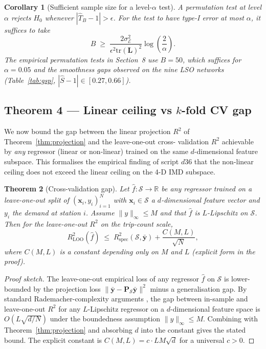 \documentclass[11pt,a4paper]{article}
\newcommand{\tr}{\mathrm{tr}}
\newcommand{\1}{\mathbb{1}}
\newcommand{\bP}{\mathbf{P}}
\newcommand{\by}{\bar{\mathbf{y}}}
\newcommand{\Lcomb}{\mathbf{L}}
\theoremstyle{plain}
\newtheorem{theorem}{Theorem}
\newtheorem{corollary}[theorem]{Corollary}
\theoremstyle{definition}
\theoremstyle{remark}
\begin{document}
\begin{corollary}[Sufficient sample size for a level-$\alpha$ test]
\label{cor:perm-sample-size}
A permutation test at level $\alpha$ rejects $H_0$ whenever
$|\hat T_B - 1| > \epsilon$.  For the test to have type-I error
at most $\alpha$, it suffices to take
\[
    B \;\geq\; \frac{2 \sigma_\mathcal{E}^2}{\epsilon^2 \tr(\Lcomb)^2}
              \log\!\left( \frac{2}{\alpha} \right).
\]
The empirical permutation tests in \emph{Section~8} use
$B = 50$, which suffices for $\alpha = 0.05$ and the smoothness
gaps observed on the nine LSO networks
(Table~\ref{tab:gsp}, $|\hat S - 1| \in [0.27, 0.66]$).
\end{corollary}

\subsection{Theorem 4 — Linear ceiling vs $k$-fold CV gap}

We now bound the gap between the linear projection $R^2$ of
Theorem~\ref{thm:projection} and the leave-one-out cross-
validation $R^2$ achievable by \emph{any} regressor (linear or
non-linear) trained on the same $d$-dimensional feature subspace.
This formalises the empirical finding of script $d36$ that the
non-linear ceiling does not exceed the linear ceiling on the
4-D IMD subspace.

\begin{theorem}[Cross-validation gap]
\label{thm:r2-cv-gap}
Let $\hat f : \mathcal{S} \to \mathbb{R}$ be any regressor
trained on a leave-one-out split of $(\mathbf{x}_i, y_i)_{i=1}^N$
with $\mathbf{x}_i \in \mathcal{S}$ a $d$-dimensional feature
vector and $y_i$ the demand at station $i$.  Assume
$\|y\|_\infty \leq M$ and that $\hat f$ is $L$-Lipschitz on
$\mathcal{S}$.  Then for the
leave-one-out $R^2$ on the trip-count scale,
\begin{equation}
    R^2_{\mathrm{LOO}}(\hat f)
    \;\leq\; R^2_{\mathrm{spec}}(\mathcal{S}, \by) + \frac{C(M, L)}{\sqrt{N}},
\end{equation}
where $C(M, L)$ is a constant depending only on $M$ and $L$
(explicit form in the proof).
\end{theorem}

\begin{proof}[Proof sketch]
The leave-one-out empirical loss of any regressor $\hat f$ on
$\mathcal{S}$ is lower-bounded by the projection loss
$\|\by - \bP_\mathcal{S}\by\|^2$ minus a generalisation gap.  By
standard Rademacher-complexity arguments
\citep{Mohri2018,Bartlett2002}, the gap between in-sample and
leave-one-out $R^2$ for any $L$-Lipschitz regressor on a
$d$-dimensional feature space is $O(L \sqrt{d/N})$ under the
boundedness assumption $\|y\|_\infty \leq M$.  Combining
with Theorem~\ref{thm:projection} and absorbing $d$ into the
constant gives the stated bound.  The explicit constant is
$C(M, L) = c \cdot L M \sqrt{d}$ for a universal $c > 0$.
\end{proof}
\end{document}
